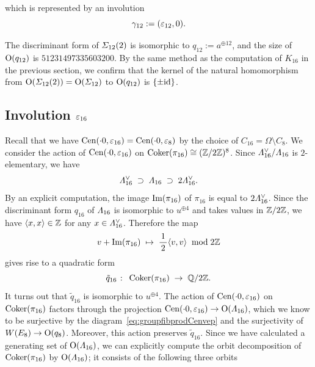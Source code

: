 \documentclass{amsart} %
\begin{document}
 which is 
 represented by an involution 
 \[
 \gamma_{12}:=(\varepsilon_{12}, 0).
 \]
 \begin{remark}\label{rem:q12}
 The discriminant form of $\varSigma_{12}(2)$ is isomorphic to
 $q_{12}:=a^{\oplus 12}$, 
and the size of $\mathord{\mathrm{O}}(q_{12})$ is $51231497335603200$.
 By the same method as the computation of $K_{16}$ in the previous section,
 we confirm that the kernel of the natural homomorphism from 
 $\mathord{\mathrm{O}}(\varSigma_{12}(2))=\mathord{\mathrm{O}}(\varSigma_{12})$ to $\mathord{\mathrm{O}}(q_{12})$ 
 is $\{\pm \mathord{\mathrm{id}}\}$.
 \end{remark}
\subsection{Involution $\varepsilon_{16}$}\label{subsec:vep16}
%
Recall that we have $\mathrm{Cen}(\cdot 0, \varepsilon_{16})=\mathrm{Cen}(\cdot 0, \varepsilon_{8})$
by the choice of $C_{16}=\Omega\setminus C_8$.
We consider the action of $\mathrm{Cen}(\cdot 0, \varepsilon_{16})$
on $\operatorname{Coker}(\pi_{16})\cong (\mathord{\mathbb{Z}}/2\mathord{\mathbb{Z}})^8$.
Since $\varLambda_{16}^{\vee}/\varLambda_{16}$ 
is $2$-elementary,
we have
%
\begin{equation} \label{eq:filteration}
\varLambda_{16}^{\vee} \;\supset\; \varLambda_{16}\; \supset \; 2\varLambda_{16}^{\vee}.
\end{equation}
%
By an explicit computation,
the image $\operatorname{Im}(\pi_{16})$ of $\pi_{16}$ is equal to $2\varLambda_{16}^{\vee}$.
Since the discriminant form $q_{16}$ of $\varLambda_{16}$ 
is isomorphic to $u^{\oplus 4}$ and takes values in $\mathord{\mathbb{Z}}/2\mathord{\mathbb{Z}}$,
we have $\langle x, x \rangle\in \mathord{\mathbb{Z}}$ for any $x\in \varLambda_{16}^{\vee}$.
Therefore the map
\[
v+\operatorname{Im} (\pi_{16}) \;\mapsto\; \frac{\,1\,}{2} \langle v, v \rangle \;\bmod 2\mathord{\mathbb{Z}}
\]
gives rise to a quadratic form 
\[
\tilde{q}_{16}\;\colon\; \operatorname{Coker} (\pi_{16})\;\to\; \mathord{\mathbb{Q}}/2\mathord{\mathbb{Z}}.
 \]
It turns out that $\tilde{q}_{16}$ is isomorphic to $u^{\oplus 4}$.
The action of $\mathrm{Cen}(\cdot 0, \varepsilon_{16})$ on $\operatorname{Coker} (\pi_{16})$ 
factors through the projection
$\mathrm{Cen}(\cdot 0, \varepsilon_{16})\to \mathord{\mathrm{O}}(\varLambda_{16})$,
which we know to be surjective
by the diagram~\eqref{eq:groupfibprodCenvep} and the surjectivity of 
$W(E_8)\to \mathord{\mathrm{O}}(q_8)$. 
Moreover, this action 
preserves $\tilde{q}_{16}$.
Since we have calculated a generating set of $\mathord{\mathrm{O}}(\varLambda_{16})$,
we can explicitly compute the orbit decomposition of $\operatorname{Coker} (\pi_{16})$
by $\mathord{\mathrm{O}}(\varLambda_{16})$; it consists of the following three orbits 
\end{document}

